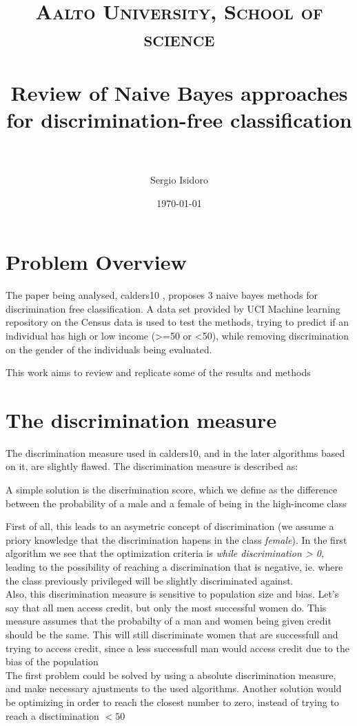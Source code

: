 \documentclass[paper=a4, fontsize=11pt]{scrartcl} %
\title{	
\normalfont \normalsize 
\textsc{Aalto University, School of science} \\ [25pt] %
\horrule{0.5pt} \\[0.4cm] %
\huge  Review of Naive Bayes approaches for discrimination-free classification \\ %
\horrule{2pt} \\[0.5cm] %
}
\author{Sergio Isidoro} %
\date{\normalsize\today} %
\numberwithin{equation}{section} %
\numberwithin{figure}{section} %
\numberwithin{table}{section} %
\begin{document}
\maketitle %


\section{Problem Overview}

The paper being analysed, calders10 \cite{calders10}, proposes 3 naive bayes methods for discrimination free classification. A data set provided by UCI Machine learning repository \cite{uc_repo} on the Census \cite{dataset} data is used to test the methods, trying to predict if an individual has high or low income (>=50 or <50), while removing discrimination on the gender of the individuals being evaluated.

This work aims to review and replicate some of the results and methods

\section{The discrimination measure}
The discrimination measure used in calders10, and in the later algorithms based on it, are slightly flawed. The discrimination measure is described as:
\begin{displayquote}
A simple solution is the discrimination score, which we define as the difference between the probability of a male and a female of being in the high-income class
\end{displayquote}
First of all, this leads to an asymetric concept of discrimination (we assume a priory knowledge that the discrimination hapens in the class \textit{female}). In the first algorithm we see that the optimization criteria is \textit{while discrimination > 0}, leading to the possibility of reaching a discrimination that is negative, ie. where the class previously privileged will be slightly discriminated against.
\\
Also, this discrimination measure is sensitive to population size and bias. Let's say that all men access credit, but only the most successful women do. This measure assumes that the probabilty of a man and women being given credit should be the same. This will still discriminate women that are successfull and trying to access credit, since a less successfull man would access credit due to the bias of the population
\\
The first problem could be solved by using a absolute discrimination measure, and make necessary ajustments to the used algorithms. Another solution would be optimizing in order to reach the closest number to zero, instead of trying to reach a disctimination $<50$
\end{document}

